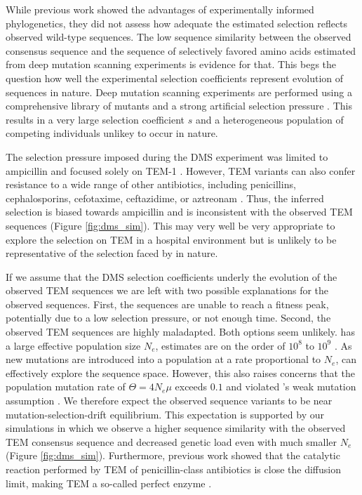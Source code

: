 While previous work showed the advantages of experimentally informed phylogenetics, they did not assess how adequate the estimated selection reflects observed wild-type sequences.
The low sequence similarity between the observed consensus sequence and the sequence of selectively favored amino acids estimated from deep mutation scanning experiments is evidence for that.
This begs the question how well the experimental selection coefficients represent evolution of sequences in nature.
Deep mutation scanning experiments are performed using a comprehensive library of mutants and a strong artificial selection pressure \citep{FirnbergAndOstermeier2012, Jain2014, FowlerAndFields2014, Fowler2014}.
This results in a very large selection coefficient $s$ and a heterogeneous population of competing individuals unlikey to occur in nature.

The selection pressure imposed during the DMS experiment was limited to ampicillin and focused solely on TEM-1 \citep{stiffler2016}.
However, TEM variants can also confer resistance to a wide range of other antibiotics, including penicillins, cephalosporins, cefotaxime, ceftazidime, or aztreonam \citep{sougakoff1988,sougakoff1989,goussard1991,mabilat1992,chanal1992,brun1994}.
Thus, the inferred selection is biased towards ampicillin and is inconsistent with the observed TEM sequences (Figure \ref{fig:dms_sim}).
This may very well be very appropriate to explore the selection on TEM in a hospital environment but is unlikely to be representative of the selection faced by \ecoli in nature.


If we assume that the DMS selection coefficients underly the evolution of the observed TEM sequences we are left with two possible explanations for the observed sequences.
First, the sequences are unable to reach a fitness peak, potentially due to a low selection pressure, or not enough time.
Second, the observed TEM sequences are highly maladapted.
Both options seem unlikely.
\ecoli has a large effective population size $N_e$, estimates are on the order of $10^8$ to $10^9$ \citep{OchmanAndWilson1987, hartl1994}.
As new mutations are introduced into a population at a rate proportional to $N_e$, \ecoli can effectively explore the sequence space.
However, this also raises concerns that the population mutation rate of \ecoli $\Theta = 4N_e\mu$ exceeds $0.1$ and violated \selac's weak mutation assumption \citep{deKoning259507}.
We therefore expect the observed sequence variants to be near mutation-selection-drift equilibrium.
This expectation is supported by our simulations in which we observe a higher sequence similarity with the observed TEM consensus sequence and decreased genetic load even with much smaller $N_e$ (Figure \ref{fig:dms_sim}).
Furthermore, previous work showed that the catalytic reaction performed by TEM of penicillin-class antibiotics is close the diffusion limit, making TEM a so-called perfect enzyme \citep{matagne1998}.

